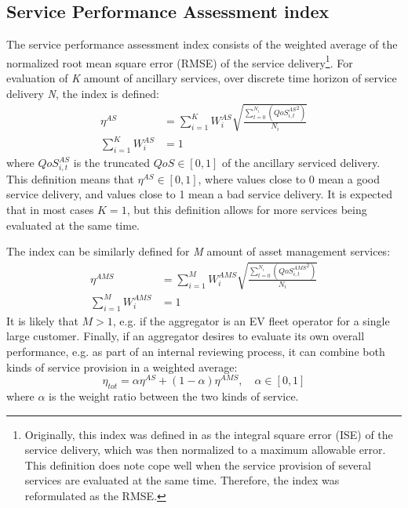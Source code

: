 \subsection{Service Performance Assessment index}
The service performance assessment index consists of the weighted average of the normalized root mean square error (RMSE) of the service delivery\footnote{Originally, this index was defined in \cite{bondy2014performance} as the integral square error (ISE) of the service delivery, which was then normalized to a maximum allowable error. This definition does note cope well when the service provision of several services are evaluated at the same time. Therefore, the index was reformulated as the RMSE.}. For evaluation of \emph{K} amount of ancillary services, over discrete time horizon of service delivery \emph{N}, the index is defined:
\begin{align}\label{eq:MAINetaAS}
\eta^{AS} &= \sum^{K}_{i=1} W^{AS}_i \sqrt{\frac{\sum^{N_i}_{t=0} \left( {QoS^{AS}_{i,t}}^{2} \right)}{N_i}}\\
\sum_{i=1}^K W^{AS}_i &= 1 \label{eq:was}
\end{align}
where $QoS^{AS}_{i,t}$ is the truncated $QoS \in [0,1]$ of the ancillary serviced delivery. This definition means that $\eta^{AS} \in [0,1]$, where values close to 0 mean a good service delivery, and values close to 1 mean a bad service delivery. It is expected that in most cases $K=1$, but this definition allows for more services being evaluated at the same time.

The index can be similarly defined for \emph{M} amount of asset management services:
\begin{align}\label{eq:MAINetaAMS}
\eta^{AMS} &= \sum^{M}_{i=1} W^{AMS}_i \sqrt{\frac{\sum^{N_i}_{t=0} \left( {QoS^{AMS}_{i,t}}^{2} \right)}{N_i}}\\
\sum_{i=1}^M W^{AMS}_i &= 1 \label{eq:wams}
\end{align}
It is likely that $M > 1$, e.g. if the aggregator is an EV fleet operator for a single large customer. Finally, if an aggregator desires to evaluate its own overall performance, e.g. as part of an internal reviewing process, it can combine both kinds of service provision in a weighted average:
\begin{equation}
\eta_{tot} = \alpha \eta^{AS} + (1-\alpha) \eta^{AMS}, \quad \alpha \in [0,1]
\end{equation}
where $\alpha$ is the weight ratio  between the two kinds of service. 

